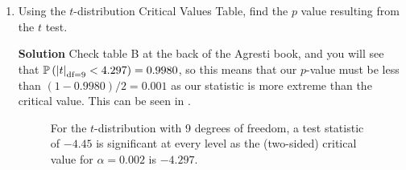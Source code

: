 \begin{enumerate}
\begin{enumerate}
        \item Using the $t$-distribution Critical Values Table, find the $p$ value resulting from the $t$ test.
        \begin{framed}{\textbf{Solution}}
        Check table B at the back of the Agresti book, and you will see that $\operatorname{\mathbb{P}}{\left( \left\vert t\right\vert_{\text{df}=9}<4.297\right)} = 0.9980$, so this means that our $p$-value must be less than $(1 - 0.9980)/2 = 0.001$ as our statistic is more extreme than the critical value. This can be seen in .
        \end{framed}
        \FloatBarrier
        \begin{figure}[h]
        \centering
        \caption{For the $t$-distribution with 9 degrees of freedom, a test statistic of $-4.45$ is significant at every level as the (two-sided) critical value for $\alpha = 0.002$ is $-4.297$.}
        \label{fig:hw3q4b}
        \end{figure}
        \FloatBarrier
    \end{enumerate}
\end{enumerate}



